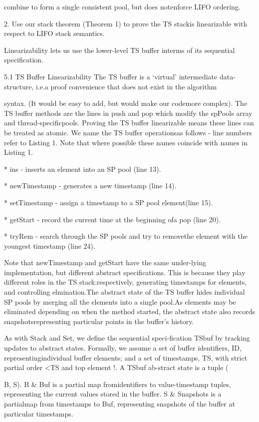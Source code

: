 combine to form a single consistent pool, but does notenforce LIFO ordering.

2. Use our stack theorem (Theorem 1) to prove the TS stackis linearizable with respect to LIFO stack semantics.

Linearizability lets us use the lower-level TS buffer interms of its sequential specification.

5.1 TS Buffer Linearizability
The TS buffer is a `virtual' intermediate data-structure, i.e.a proof convenience that does not exist in the algorithm

syntax. (It would be easy to add, but would make our codemore complex). The TS buffer methods are the lines in push
and pop which modify the spPools array and thread-specificpools. Proving the TS buffer linearizable means these lines
can be treated as atomic. We name the TS buffer operationsas follows - line numbers refer to Listing 1. Note that where
possible these names coincide with names in Listing 1.

* ins - inserts an element into an SP pool (line 13).

* newTimestamp - generates a new timestamp (line 14).

* setTimestamp - assign a timestamp to a SP pool element(line 15).

* getStart - record the current time at the beginning ofa pop (line 20).

* tryRem - search through the SP pools and try to removethe element with the youngest timestamp (line 24).

Note that newTimestamp and getStart have the same under-lying implementation, but different abstract specifications.
This is because they play different roles in the TS stack:respectively, generating timestamps for elements, and controlling elmination.The abstract state of the TS buffer hides individual
SP pools by merging all the elements into a single pool.As elements may be eliminated depending on when the
method started, the abstract state also records snapshotsrepresenting particular points in the buffer's history.

As with Stack and Set, we define the sequential speci-fication TSbuf by tracking updates to abstract states. Formally, we assume a set of buffer identifiers, ID, representingindividual buffer elements; and a set of timestamps, TS, with
strict partial order <TS and top element !. A TSbuf ab-stract state is a tuple (

B, S). B & Buf is a partial map fromidentifiers to value-timestamp tuples, representing the current values stored in the buffer. S & Snapshots is a partialmap from timestamps to Buf, representing snapshots of the
buffer at particular timestamps.

